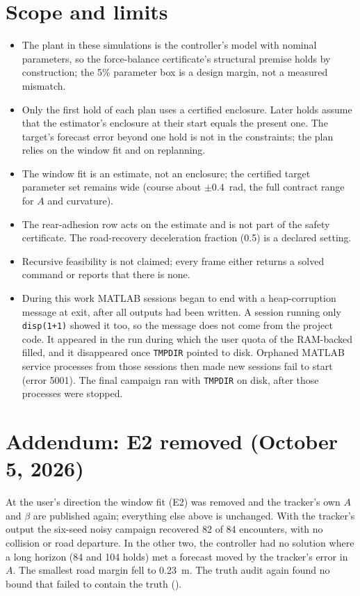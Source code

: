 \documentclass[11pt]{article}
\begin{document}
\section{Scope and limits}
\begin{itemize}
\item The plant in these simulations is the controller's model with nominal
  parameters, so the force-balance certificate's structural premise holds by
  construction; the 5\% parameter box is a design margin, not a measured
  mismatch.
\item Only the first hold of each plan uses a certified enclosure. Later holds
  assume that the estimator's enclosure at their start equals the present one.
  The target's forecast error beyond one hold is not in the constraints; the
  plan relies on the window fit and on replanning.
\item The window fit is an estimate, not an enclosure; the certified target
  parameter set remains wide (course about $\pm0.4$~rad, the full contract
  range for $A$ and curvature).
\item The rear-adhesion row acts on the estimate and is not part of the safety
  certificate. The road-recovery deceleration fraction (0.5) is a declared
  setting.
\item Recursive feasibility is not claimed; every frame either returns a
  solved command or reports that there is none.
\item During this work MATLAB sessions began to end with a heap-corruption
  message at exit, after all outputs had been written. A session running only
  \texttt{disp(1+1)} showed it too, so the message does not come from the
  project code. It appeared in the run during which the user quota of the
  RAM-backed  filled, and it disappeared once \texttt{TMPDIR}
  pointed to disk. Orphaned MATLAB service processes from those sessions
  then made new sessions fail to start (error 5001). The final campaign ran
  with \texttt{TMPDIR} on disk, after those processes were stopped.
\end{itemize}

\section{Addendum: E2 removed (October 5, 2026)}
At the user's direction the window fit (E2) was removed and the tracker's own
$A$ and $\beta$ are published again; everything else above is unchanged.
With the tracker's output the six-seed noisy campaign recovered 82 of 84
encounters, with no collision or road departure. In the other two, the
controller had no solution where a long horizon (84 and 104 holds) met a
forecast moved by the tracker's error in $A$. The smallest road margin
fell to 0.23~m. The truth audit again found no bound that failed to contain
the truth ().
\end{document}
